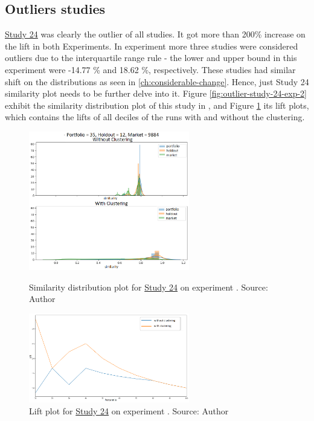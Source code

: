 \subsection{Outliers studies}
\label{ch:outliers}

\underline{Study 24} was clearly the outlier of all studies. It got more than 200\% increase on the lift in both Experiments. In experiment \nameExperimentII{} more three studies were considered outliers due to the interquartile range rule - the lower and upper bound in this experiment were -14.77 \% and 18.62 \%, respectively. These studies had similar shift on the distributions as seen in \ref{ch:considerable-change}. Hence, just Study 24 similarity plot needs to be further delve into it. Figure \ref{fig:outlier-study-24-exp-2} exhibit the similarity distribution plot of this study in \nameExperimentII{}, and Figure \ref{fig:outlier-study-24-lift-exp-2} its lift plots, which contains the lifts of all deciles of the runs with and without the clustering.

\begin{figure}[h]
   \centering
   \includegraphics[width=7cm]{fig/ch4-outlier-study-24-exp-2.png}
   \caption{Similarity distribution plot for \underline{Study 24} on experiment \nameExperimentII{}. Source: Author}
   \label{fig:outlier-study-24-exp-2}

   \includegraphics[width=7cm]{fig/ch4-outlier-study-24-lift-exp-2.png}
   \caption{Lift plot for \underline{Study 24} on experiment \nameExperimentII{}. Source: Author}
   \label{fig:outlier-study-24-lift-exp-2}
\end{figure}

